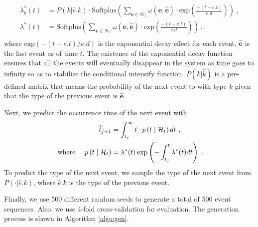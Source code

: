 \begin{equation}
\begin{aligned}
\lambda_{k}^{*}(t) & = P(k | \hat{e}.k) \cdot \text{Softplus} \left(\sum_{\textbf{e} \in \mathcal{H}_t} \omega(\textbf{e}, \hat{\textbf{e}}) \cdot \text{exp} \left( \frac{- (t - e.t)}{e.d} \right) \right) ~,\\
\lambda^{*}(t) & = \text{Softplus} \left(\sum_{\textbf{e} \in \mathcal{H}_t} \omega(\textbf{e}, \hat{\textbf{e}}) \cdot \text{exp} \left( \frac{- (t - e.t)}{e.d} \right) \right) ~.\\
\end{aligned}
\label{eq:lam}
\end{equation}
where $\text{exp} \left( - (t - e.t) / e.d \right)$ is the exponential decay effect for each event, $\hat{\textbf{e}}$ is the last event as of time $t$. The existence of the exponential decay function ensures that all the events will eventually disappear in the system as time goes to infinity so as to stabilize the conditional intensify function. $P(k | \hat{k})$ is a pre-defined matrix that means the probability of the next event to with type $k$ given that the type of the previous event is $\hat{\textbf{e}}$.

Next, we predict the occurrence time of the next event with
\begin{equation}
    \begin{aligned}
        \widehat{t}_{j+1} & =\int_{t_j}^{\infty} t \cdot p\left(t \mid \mathcal{H}_t\right) d t ~,\\
        \text{ where \quad} p\left(t \mid \mathcal{H}_t\right) & =\lambda^{*}(t) \exp \left(-\int_{t_j}^t \lambda^{*}(t) d t\right) ~.\\
    \end{aligned}
    \label{eq:pre}
\end{equation}
To predict the type of the next event, we sample the type of the next event from $P(\cdot | \hat{e}.k)$, where $\hat{e}.k$ is the type of the previous event.

Finally, we use 500 different random seeds to generate a total of 500 event sequences. Also, we use 4-fold cross-validation for evaluation. The generation process is shown in Algorithm \ref{algo:gen}.

